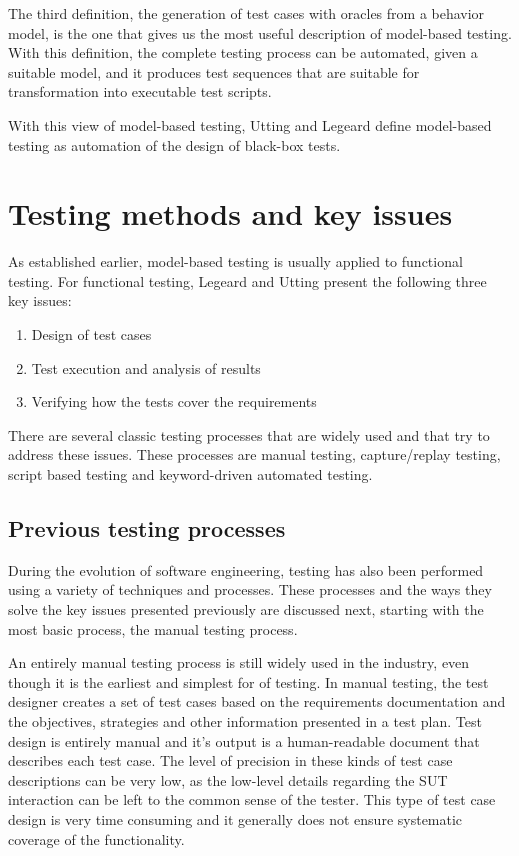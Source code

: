The third definition, the generation of test cases with oracles from a behavior model, is the one that gives us the most useful description of model-based testing. With this definition, the complete testing process can be automated, given a suitable model, and it produces test sequences that are suitable for transformation into executable test scripts.

With this view of model-based testing, Utting and Legeard define model-based testing as automation of the design of black-box tests.

\section{Testing methods and key issues}
As established earlier, model-based testing is usually applied to functional testing. For functional testing, Legeard and Utting present the following three key issues:

\begin{enumerate}
	\item Design of test cases
	\item Test execution and analysis of results
	\item Verifying how the tests cover the requirements
\end{enumerate}

There are several classic testing processes that are widely used and that try to address these issues. These processes are manual testing, capture/replay testing, script based testing and keyword-driven automated testing.

\subsection{Previous testing processes}
During the evolution of software engineering, testing has also been performed using a variety of techniques and processes. These processes and the ways they solve the key issues presented previously are discussed next, starting with the most basic process, the manual testing process.

An entirely manual testing process is still widely used in the industry, even though it is the earliest and simplest for of testing. In manual testing, the test designer creates a set of test cases based on the requirements documentation and the objectives, strategies and other information presented in a test plan. Test design is entirely manual and it's output is a human-readable document that describes each test case. The level of precision in these kinds of test case descriptions can be very low, as the low-level details regarding the SUT interaction can be left to the common sense of the tester. This type of test case design is very time consuming and it generally does not ensure systematic coverage of the functionality.

